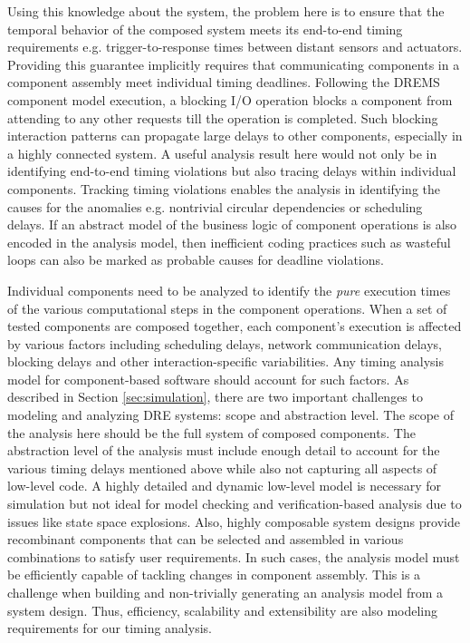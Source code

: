 Using this knowledge about the system, the problem here is to ensure that the temporal behavior of the composed system meets its end-to-end timing requirements e.g. trigger-to-response times between distant sensors and actuators. Providing this guarantee implicitly requires that communicating components in a component assembly meet individual timing deadlines. Following the DREMS component model execution, a blocking I/O operation blocks a component from attending to any other requests till the operation is completed. Such blocking interaction patterns can propagate large delays to other components, especially in a highly connected system. A useful analysis result here would not only be in identifying end-to-end timing violations but also tracing delays within individual components. Tracking timing violations enables the analysis in identifying the causes for the anomalies e.g. nontrivial circular dependencies or scheduling delays. If an abstract model of the business logic of component operations is also encoded in the analysis model, then inefficient coding practices such as wasteful loops can also be marked as probable causes for deadline violations. 

Individual components need to be analyzed to identify the \emph{pure} execution times of the various computational steps in the component operations. When a set of tested components are composed together, each component's execution is affected by various factors including scheduling delays, network communication delays, blocking delays and other interaction-specific variabilities. Any timing analysis model for component-based software should account for such factors. As described in Section \ref{sec:simulation}, there are two important challenges to modeling and analyzing DRE systems: scope and abstraction level. The scope of the analysis here should be the full system of composed components. The abstraction level of the analysis must include enough detail to account for the various timing delays mentioned above while also not capturing all aspects of low-level code. A highly detailed and dynamic low-level model is necessary for simulation but not ideal for model checking and verification-based analysis due to issues like state space explosions. Also, highly composable system designs provide recombinant components that can be selected and assembled in various combinations to satisfy user requirements. In such cases, the analysis model must be efficiently capable of tackling changes in component assembly. This is a challenge when building and non-trivially generating an analysis model from a system design. Thus, efficiency, scalability and extensibility are also modeling requirements for our timing analysis.

